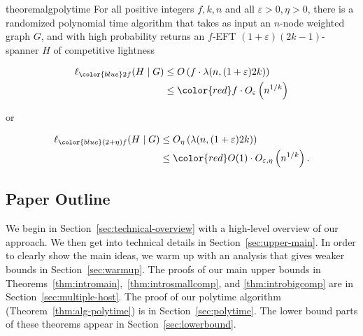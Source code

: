 \documentclass{article}
\newif\ifshort
\theoremstyle{plain}
\theoremstyle{definition}
\newcommand{\eps}{\varepsilon}
\begin{document}
\begin{restatable}{theorem}{algpolytime} \label{thm:alg-polytime}
For all positive integers $f, k, n$ and all $\eps > 0, \eta > 0$, there is a randomized polynomial time algorithm that takes as input an $n$-node weighted graph $G$, and with high probability returns an $f$-EFT $(1+\eps)(2k-1)$-spanner $H$ of competitive lightness

\begin{minipage}{.45\linewidth}
\begin{align*}
\ell_{\color{blue} 2f}(H \mid G) &\le O\left( f \cdot \lambda(n, (1+\eps)2k)\right)\\
                                 &\le {\color{red} f} \cdot O_{\eps}\left( n^{1/k} \right)
\end{align*}
\end{minipage}\begin{minipage}{0.1\linewidth}
or
\end{minipage}\begin{minipage}{.45\linewidth}
\begin{align*}
\ell_{\color{blue} (2+\eta)f}(H \mid G) &\le O_{\eta}\left( \lambda(n, (1+\eps)2k)\right)\\
                                        &\le {\color{red} O(1)} \cdot O_{\eps, \eta}\left( n^{1/k} \right).
\end{align*}
\end{minipage}
\end{restatable}

\subsection{Paper Outline}

We begin in Section~\ref{sec:technical-overview} with a high-level overview of our approach.  We then get into technical details in Section~\ref{sec:upper-main}.  In order to clearly show the main ideas, we warm up with an analysis that gives weaker bounds in Section~\ref{sec:warmup}.
The proofs of our main upper bounds in Theorems~\ref{thm:intromain},~\ref{thm:introsmallcomp}, and \ref{thm:introbigcomp} are in Section~\ref{sec:multiple-host}.  \ifshort Due to space constraints, the proof of our polytime algorithm (Theorem~\ref{thm:alg-polytime}) is deferred to Appendix~\ref{app:polytime}, and the proofs of all of our lower bounds (Theorem~\ref{thm:lower-bound-main}, and the lower bounds from Theorems~\ref{thm:intromain}, \ref{thm:introsmallcomp}, and~\ref{thm:introbigcomp}) are deferred to Appendix~\ref{app:lowerbound}.\else The proof of our polytime algorithm (Theorem~\ref{thm:alg-polytime}) is in Section~\ref{sec:polytime}.
The lower bound parts of these theorems appear in Section~\ref{sec:lowerbound}.\fi
\end{document}
